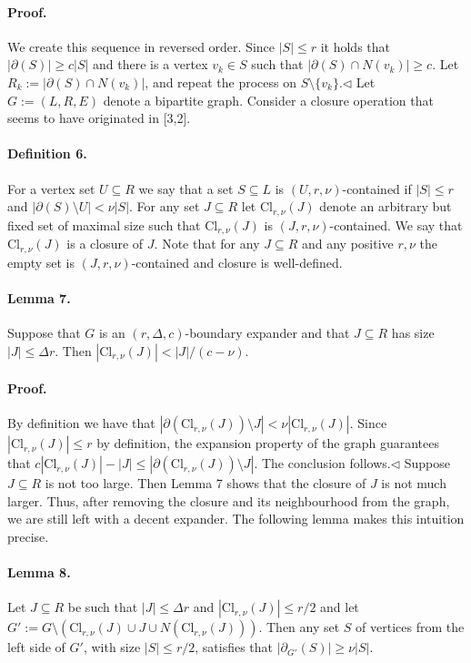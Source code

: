 \documentclass[10pt,a4paper]{article}
\begin{document}
\paragraph{Proof.} We create this sequence in reversed order. Since $|S|\leq r$ it holds that $|\partial(S)|\geq c|S|$ and there is a vertex $v_k\in S$ such that $|\partial(S)\cap N(v_k)|\geq c$. Let $R_k:=|\partial(S)\cap N(v_k)|$, and repeat the process on $S\setminus\{v_k\}$.\hfill$\triangleleft$
Let $G:=(L,R,E)$ denote a bipartite graph. Consider a closure operation that seems to have originated in [3,2].
\paragraph{Definition 6.} For a vertex set $U\subseteq R$ we say that a set $S\subseteq L$ is $(U,r,\nu)$-contained if $|S|\leq r$ and $|\partial(S)\setminus U|<\nu|S|$. For any set $J\subseteq R$ let $\mathrm{Cl}_{r,\nu}(J)$ denote an arbitrary but fixed set of maximal size such that $\mathrm{Cl}_{r,\nu}(J)$ is $(J,r,\nu)$-contained. We say that $\mathrm{Cl}_{r,\nu}(J)$ is a closure of $J$.
Note that for any $J\subseteq R$ and any positive $r,\nu$ the empty set is $(J,r,\nu)$-contained and closure is well-defined.
\paragraph{Lemma 7.} Suppose that $G$ is an $(r,\Delta,c)$-boundary expander and that $J\subseteq R$ has size $|J|\leq\Delta r$. Then $|\mathrm{Cl}_{r,\nu}(J)|<|J|/(c-\nu)$.
\paragraph{Proof.} By definition we have that $|\partial(\mathrm{Cl}_{r,\nu}(J))\setminus J|<\nu|\mathrm{Cl}_{r,\nu}(J)|$. Since $|\mathrm{Cl}_{r,\nu}(J)|\leq r$ by definition, the expansion property of the graph guarantees that $c|\mathrm{Cl}_{r,\nu}(J)|-|J|\leq|\partial(\mathrm{Cl}_{r,\nu}(J))\setminus J|$. The conclusion follows.\hfill$\triangleleft$
Suppose $J\subseteq R$ is not too large. Then Lemma 7 shows that the closure of $J$ is not much larger. Thus, after removing the closure and its neighbourhood from the graph, we are still left with a decent expander. The following lemma makes this intuition precise.
\paragraph{Lemma 8.} Let $J\subseteq R$ be such that $|J|\leq\Delta r$ and $|\mathrm{Cl}_{r,\nu}(J)|\leq r/2$ and let $G':=G\setminus(\mathrm{Cl}_{r,\nu}(J)\cup J\cup N(\mathrm{Cl}_{r,\nu}(J)))$. Then any set $S$ of vertices from the left side of $G'$, with size $|S|\leq r/2$, satisfies that $|\partial_{G'}(S)|\geq\nu|S|$.
\end{document}
